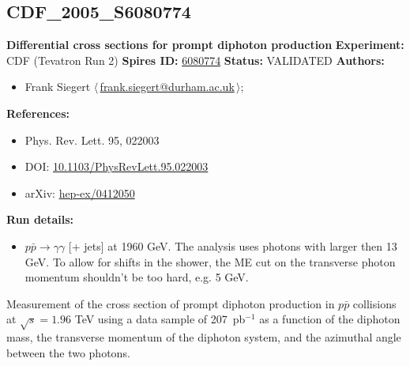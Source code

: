 \clearpage


\clearpage

\subsection[CDF\_2005\_S6080774]{CDF\_2005\_S6080774\,\cite{Acosta:2004sn}}
\textbf{Differential cross sections for prompt diphoton production}\newline
\textbf{Experiment:} CDF (Tevatron Run 2) \newline
\textbf{Spires ID:} \href{http://www.slac.stanford.edu/spires/find/hep/www?rawcmd=key+6080774}{6080774}\newline
\textbf{Status:} VALIDATED\newline
\textbf{Authors:}
\begin{itemize}
  \item Frank Siegert $\langle\,$\href{mailto:frank.siegert@durham.ac.uk}{frank.siegert@durham.ac.uk}$\,\rangle$;
\end{itemize}
\textbf{References:}
\begin{itemize}
  \item Phys. Rev. Lett. 95, 022003
  \item DOI: \href{http://dx.doi.org/10.1103/PhysRevLett.95.022003}{10.1103/PhysRevLett.95.022003}
  \item arXiv: \href{http://arxiv.org/abs/hep-ex/0412050}{hep-ex/0412050}
\end{itemize}
\textbf{Run details:}
\begin{itemize}

  \item $p \bar{p} \to \gamma \gamma$ [+ jets] at 1960 GeV. The analysis uses photons with \pT larger then 13 GeV. To allow for shifts in the shower, the ME cut on the transverse photon momentum shouldn't be too hard, e.g. 5 GeV.\end{itemize}

\noindent Measurement of the cross section of prompt diphoton production in $p\bar{p}$ collisions at $\sqrt{s} = 1.96$ TeV using a data sample of 207~pb$^{-1}$ as a function of the diphoton mass, the transverse momentum of the diphoton system, and the azimuthal angle between the two photons.

\clearpage


\clearpage

